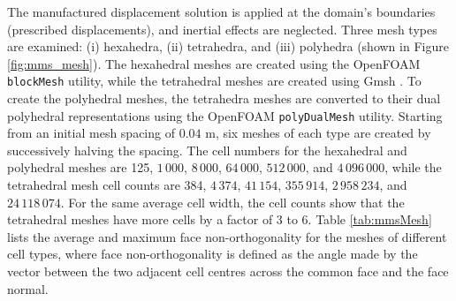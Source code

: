 \documentclass[sn-mathphys,Numbered]{sn-jnl}%
\begin{document}
The manufactured displacement solution is applied at the domain's boundaries (prescribed displacements), and inertial effects are neglected.
Three mesh types are examined:
(i) hexahedra, (ii) tetrahedra, and (iii) polyhedra (shown in Figure \ref{fig:mms_mesh}).
The hexahedral meshes are created using the OpenFOAM \texttt{blockMesh} utility, while the tetrahedral meshes are created using Gmsh \citep{geuzaine2009gmsh}.
To create the polyhedral meshes, the tetrahedra meshes are converted to their dual polyhedral representations using the OpenFOAM \texttt{polyDualMesh} utility.
Starting from an initial mesh spacing of $0.04$ m, six meshes of each type are created by successively halving the spacing.
The cell numbers for the hexahedral and polyhedral meshes are 125, $1\,000$, $8\,000$, $64\,000$, $512\,000$, and $4\,096\,000$, while the tetrahedral mesh cell counts are 384, $4\,374$, $41\,154$, $355\,914$, $2\,958\,234$, and $24\,118\,074$.
For the same average cell width, the cell counts show that the tetrahedral meshes have more cells by a factor of 3 to 6.
Table \ref{tab:mmsMesh} lists the average and maximum face non-orthogonality for the meshes of different cell types, where face non-orthogonality is defined as the angle made by the vector between the two adjacent cell centres across the common face and the face normal.
\end{document}
